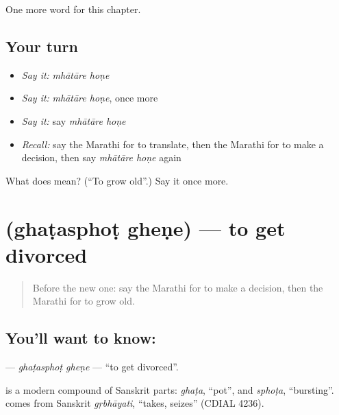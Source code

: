 \begin{grammarlens}[title={What you've built}]
One more word for this chapter.
\end{grammarlens}

\subsection*{Your turn}
\begin{itemize}
\raggedright
  \item \emph{Say it:} \emph{mhātāre hoṇe}
  \item \emph{Say it:} \emph{mhātāre hoṇe}, once more
  \item \emph{Say it:} say \emph{mhātāre hoṇe}
  \item \emph{Recall:} say the Marathi for to translate, then the Marathi for to make a decision, then say \emph{mhātāre hoṇe} again
\end{itemize}

\begin{tcolorbox}[breakable,colback=teal!4,colframe=teal!35!black,title={Before you move on}]
What does   mean? (\textquotedblleft{}To grow old\textquotedblright{}.) Say it once more.
\end{tcolorbox}
\section[\texorpdfstring{\mr{घटस्फोट} \mr{घेणे} (ghaṭasphoṭ gheṇe)}{घटस्फोट घेणे (ghaṭasphoṭ gheṇe)}]{  (ghaṭasphoṭ gheṇe) — to get divorced}

\label{lesson:MR-C224-ghatasphot-ghene}



\begin{quote}
Before the new one: say the Marathi for to make a decision, then the Marathi for to grow old.
\end{quote}

\subsection*{You'll want to know:  }
\textbf{ } — \emph{ghaṭasphoṭ gheṇe} — \textquotedblleft{}to get divorced\textquotedblright{}.

\begin{cousinweb}
\textbf{} is a modern compound of Sanskrit parts: \emph{ghaṭa}, \textquotedblleft{}pot\textquotedblright{}, and \emph{sphoṭa}, \textquotedblleft{}bursting\textquotedblright{}. \textbf{} comes from Sanskrit \emph{gṛbhāyati}, \textquotedblleft{}takes, seizes\textquotedblright{} (CDIAL 4236).
\end{cousinweb}

